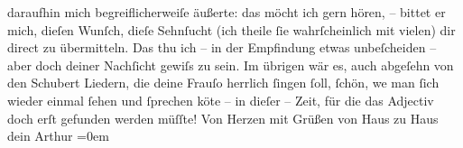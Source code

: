 \begin{ledgroupsized}[t]{13cm}
               daraufhin mich begreiflicherweiſe äußerte: das möcht ich gern hören, – bittet er
               mich,  dieſen Wunſch, dieſe Sehnſucht {\pb}(ich theile ſie
               wahrſcheinlich mit vielen) dir direct zu übermitteln. Das thu ich – in der Empfindung
               etwas unbeſcheiden – aber doch deiner Nachſicht gewiſs zu sein. Im übrigen wär es,
               auch abgeſehn von den Schubert Liedern, die
               deine Frauſo herrlich ſingen ſoll, ſchön, we{\geminationn} man ſich wieder einmal ſehen und ſprechen kö{\geminationn}te – in dieſer – Zeit, für die das Adjectiv doch erſt
               gefunden werden müſſte!\pend
           \pstart
           Von Herzen mit Grüßen von Haus zu Haus{\\[\baselineskip]}dein \spacefill\mbox{Arthur}\pend
           \leftskip=0em{}
         
         \endnumbering{}\end{ledgroupsized}  \newcommand{\dateiname}{L02203}\newcommand{\titel}{Arthur Schnitzler an Hermann Bahr, 9. 2. 1915}\newcommand{\editorInnen}{ Kurt Ifkovits,  Martin Anton Müller}
      
